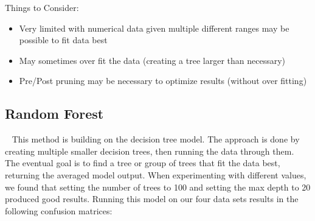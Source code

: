 \documentclass{article}
\begin{document}
		Things to Consider:
		\begin{itemize}
			\item Very limited with numerical data given multiple different ranges may be possible to fit data best
			\item May sometimes over fit the data (creating a tree larger than necessary)
			\item Pre/Post pruning may be necessary to optimize results (without over fitting)
		\end{itemize}		
		
		
		\subsection{Random Forest}~
			This method is building on the decision tree model. The approach is done by creating multiple smaller decision trees, then running the data through them. The eventual goal is to find a tree or group of trees that fit the data best, returning the averaged model output. When experimenting with different values, we found that setting the number of trees to 100 and setting the max depth to 20 produced good results. Running this model on our four data sets results in the following confusion matrices:
\end{document}
